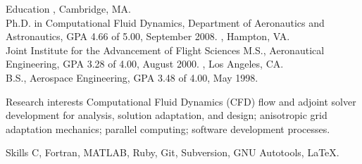 \documentclass{resume}
\author{~~~~~~Michael Andrew Park}
\begin{document}
\maketitle


\begin{category}{Education}
, Cambridge, MA.\\
Ph.D. in Computational Fluid Dynamics, Department of Aeronautics and Astronautics,  GPA 4.66 of 5.00, September 2008.
, Hampton, VA.\\
Joint Institute for the Advancement of Flight Sciences
M.S., Aeronautical Engineering, GPA 3.28 of 4.00, August 2000.
, Los Angeles, CA.\\
B.S., Aerospace Engineering, GPA 3.48 of 4.00, May 1998.
\end{category}


\begin{category}{Research interests}
\citemnobullet 
Computational Fluid Dynamics (CFD) flow and adjoint
solver development for analysis, solution adaptation, and design;
anisotropic grid adaptation mechanics; parallel computing; software
development processes.
\end{category}

\begin{category}{Skills}
\citemnobullet 
C, Fortran, MATLAB, Ruby, Git, Subversion, GNU Autotools, \LaTeX.
\end{category}
\end{document}
